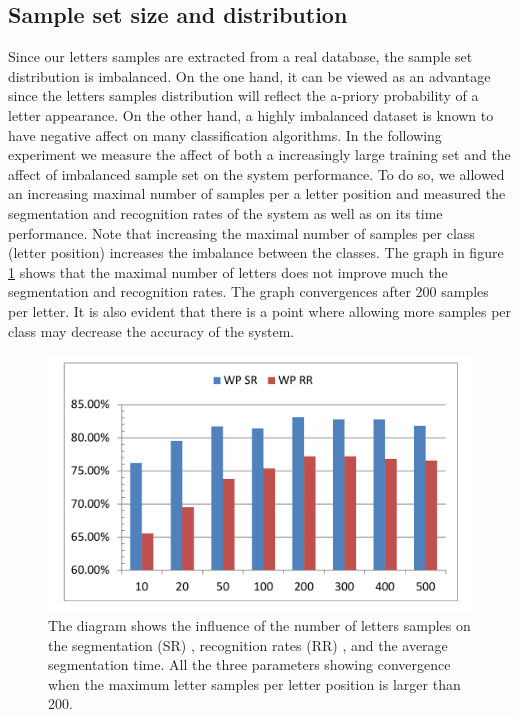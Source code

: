 \documentclass[journal,compsoc]{IEEEtran}
\begin{document}
\subsection{Sample set size and distribution}
Since our letters samples are extracted from a real database, the sample set distribution is imbalanced. On the one hand, it can be viewed as an advantage since the letters samples  distribution will reflect the a-priory probability of a letter appearance. On the other hand, a highly imbalanced dataset is known to have negative affect on many classification algorithms.
In the following experiment we measure the affect of both a increasingly large training set and the affect of imbalanced sample set on the system performance.
To do so, we allowed an increasing maximal number of samples per a letter position and measured the segmentation and recognition rates of the system as well as on its time performance. Note that increasing the maximal number of samples per class (letter position) increases the imbalance between the classes. The graph in figure \ref{fig:num_letter_impact} shows that the maximal number of letters does not improve much the segmentation and recognition rates. The graph convergences after 200 samples per letter. It is also evident that there is a point where allowing more samples per class may decrease the accuracy of the system.

\begin{figure}
\centering
\includegraphics[width=1\columnwidth]{./figures/num_letter_impact}
\caption{The diagram shows the influence of the number of letters samples on the segmentation (SR) , recognition rates (RR) , and the average segmentation time. All the three parameters showing convergence when the maximum letter samples per letter position is larger than 200. }
\label{fig:num_letter_impact}
\end{figure}
\end{document}
